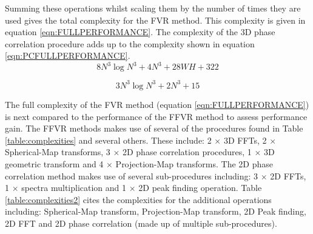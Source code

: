 Summing these operations whilst scaling them by the number of times they are used gives the total complexity for the FVR method. This complexity is given in equation \ref{eqn:FULLPERFORMANCE}. The complexity of the 3D phase correlation procedure adds up to the complexity shown in equation \ref{eqn:PCFULLPERFORMANCE}. \\

\begin{equation} \label{eqn:FULLPERFORMANCE}
8N^3\log{N^3} + 4N^3 + 28WH + 322
\end{equation}

\begin{equation} \label{eqn:PCFULLPERFORMANCE}
3N^3\log{N^3} + 2N^3 + 15
\end{equation}


The full complexity of the FVR method (equation \ref{eqn:FULLPERFORMANCE}) is next compared to the performance of the FFVR method to assess performance gain. The FFVR methods makes use of several of the procedures found in Table \ref{table:complexities} and several others. These include: 2 $\times$ 3D FFTs, 2 $\times$ Spherical-Map transforms, 3 $\times$ 2D phase correlation procedures, 1 $\times$ 3D geometric transform and 4 $\times$ Projection-Map transforms. The 2D phase correlation method makes use of several sub-procedures including: 3 $\times$ 2D FFTs, 1 $\times$ spectra multiplication and 1 $\times$ 2D peak finding operation. Table \ref{table:complexities2} cites the complexities for the additional operations including: Spherical-Map transform, Projection-Map transform, 2D Peak finding, 2D FFT and 2D phase correlation (made up of multiple sub-procedures). \\



\begin{table}[!htb]
\centering
\caption{Complexities for given Procedures}
\label{table:complexities2}
\\
\end{table}

